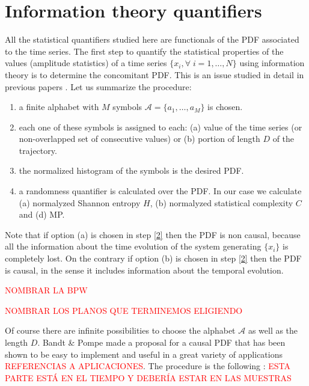 \section{Information theory quantifiers}\label{sec:quanti}

All the statistical quantifiers studied here are functionals of the PDF associated to the time series.
The first step to quantify the statistical properties of the values (amplitude statistics) of a time series $\{x_i, \forall \; i=1,\dots,N\}$ using information theory is to determine the concomitant PDF.
This is an issue studied in detail in previous papers \cite{aka varios}.
Let us summarize the procedure:
\begin{enumerate} 
\item \label{1} a finite alphabet with $M$ symbols $\mathcal{A}=\{a_1,\dots,a_M\}$ is chosen. 
\item \label{2} each one of these symbols is assigned to each: (a) value of the time series (or non-overlapped set of consecutive values) or (b) portion of length $D$ of the trajectory.
\item \label{3} the normalized histogram of the symbols is the desired PDF.
\item \label{4} a randomness quantifier is calculated over the PDF. In our case we calculate (a) normalyzed Shannon entropy $H$, (b) normalyzed statistical complexity $C$ and (d) MP.
\end{enumerate}

Note that if option (a) is chosen in step \ref{2} then the PDF is non causal, because all the information about the time evolution of the system generating $\{x_i\}$ is completely lost.
On the contrary if option (b) is chosen in step \ref{2} then the PDF is causal, in the sense it includes information about the temporal evolution.

\textcolor{red}{NOMBRAR LA BPW}

\textcolor{red}{NOMBRAR LOS PLANOS QUE TERMINEMOS ELIGIENDO}

Of course there are infinite possibilities to choose the alphabet $\mathcal{A}$ as well as the length $D$.
Bandt \& Pompe made a proposal for a causal PDF that has been shown to be easy to implement and useful in a great variety of applications \textcolor{red}{REFERENCIAS A APLICACIONES}.
The procedure is the following \cite{Bandt2002,Keller2003,Keller2005}: \textcolor{red}{ESTA PARTE ESTÁ EN EL TIEMPO Y DEBERÍA ESTAR EN LAS MUESTRAS}


